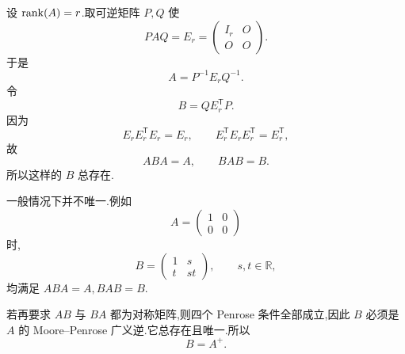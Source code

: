 \begin{solution}
设 $\operatorname{rank}(A)=r$.取可逆矩阵 $P,Q$ 使
\[
PAQ=E_r=
\begin{pmatrix}I_r&O\\O&O\end{pmatrix}.
\]
于是
\[
A=P^{-1}E_rQ^{-1}.
\]
令
\[
B=QE_r^{\mathsf T}P.
\]
因为
\[
E_rE_r^{\mathsf T}E_r=E_r,
\qquad
E_r^{\mathsf T}E_rE_r^{\mathsf T}=E_r^{\mathsf T},
\]
故
\[
ABA=A,
\qquad
BAB=B.
\]
所以这样的 $B$ 总存在.

一般情况下并不唯一.例如
\[
A=\begin{pmatrix}1&0\\0&0\end{pmatrix}
\]
时,
\[
B=
\begin{pmatrix}
1&s\\t&st
\end{pmatrix},
\qquad s,t\in\mathbb{R},
\]
均满足 $ABA=A,BAB=B$.

若再要求 $AB$ 与 $BA$ 都为对称矩阵,则四个 Penrose 条件全部成立,因此 $B$ 必须是 $A$ 的 Moore--Penrose 广义逆.它总存在且唯一.所以
\[
\boxed{B=A^+}.
\]
\end{solution}
